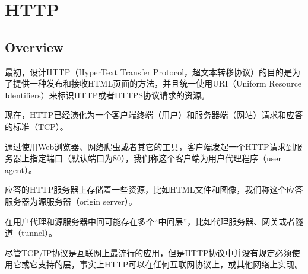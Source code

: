\begin{lstlisting}[language=PHP]

\end{lstlisting}




\begin{lstlisting}[language=PHP]

\end{lstlisting}




\begin{lstlisting}[language=PHP]

\end{lstlisting}




\begin{lstlisting}[language=PHP]

\end{lstlisting}





\chapter{HTTP}


\section{Overview}

最初，设计HTTP（HyperText Transfer Protocol，超文本转移协议）的目的是为了提供一种发布和接收HTML页面的方法，并且统一使用URI（Uniform Resource Identifiers）来标识HTTP或者HTTPS协议请求的资源。


现在，HTTP已经演化为一个客户端终端（用户）和服务器端（网站）请求和应答的标准（TCP）。

\begin{compactitem}
\item 通过使用Web浏览器、网络爬虫或者其它的工具，客户端发起一个HTTP请求到服务器上指定端口（默认端口为80），我们称这个客户端为用户代理程序（user agent）。
\item 应答的HTTP服务器上存储着一些资源，比如HTML文件和图像，我们称这个应答服务器为源服务器（origin server）。
\item 在用户代理和源服务器中间可能存在多个“中间层”，比如代理服务器、网关或者隧道（tunnel）。
\end{compactitem}

尽管TCP/IP协议是互联网上最流行的应用，但是HTTP协议中并没有规定必须使用它或它支持的层，事实上HTTP可以在任何互联网协议上，或其他网络上实现。

